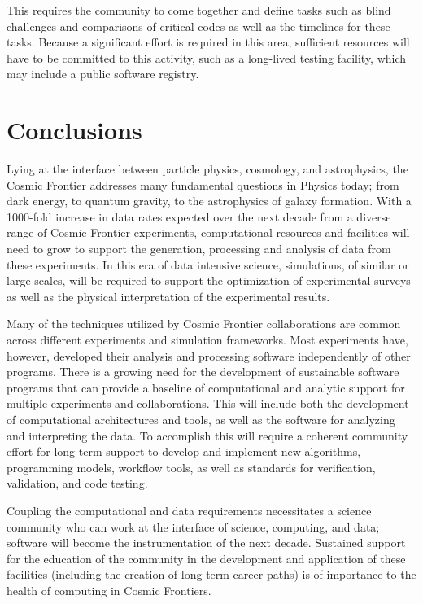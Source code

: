 This requires the community to come together and define tasks such as
blind challenges and comparisons of critical codes as well as the
timelines for these tasks. Because a significant effort is required in
this area, sufficient resources will have to be committed to this
activity, such as a long-lived testing facility, which may include a
public software registry.

\section{Conclusions}

Lying at the interface between particle physics, cosmology, and
astrophysics, the Cosmic Frontier addresses many fundamental questions
in Physics today; from dark energy, to quantum gravity, to the
astrophysics of galaxy formation.  With a 1000-fold increase in data
rates expected over the next decade from a diverse range of Cosmic
Frontier experiments, computational resources and facilities will need
to grow to support the generation, processing and analysis of data
from these experiments. In this era of data intensive science,
simulations, of similar or large scales, will be required to support the
optimization of experimental surveys as well as the physical interpretation of
the experimental results.

Many of the techniques utilized by Cosmic Frontier collaborations are
common across different experiments and simulation frameworks. Most
experiments have, however, developed their analysis and processing
software independently of other programs. There is a growing need for
the development of sustainable software programs that can provide a
baseline of computational and analytic support for multiple
experiments and collaborations.  This will include both the
development of computational architectures and tools, as well as the
software for analyzing and interpreting the data.  To accomplish this
will require a coherent community effort for long-term support to
develop and implement new algorithms, programming models, workflow
tools, as well as standards for verification, validation, and code
testing.

Coupling the computational and data requirements necessitates a
science community who can work at the interface of science, computing,
and data; software will become the instrumentation of the next
decade. Sustained support for the education of the community in the
development and application of these facilities (including the
creation of long term career paths) is of importance to the health of
computing in Cosmic Frontiers.




